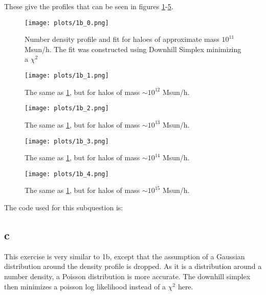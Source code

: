 These give the profiles that can be seen in figures \ref{fig:ex1b_0}-\ref{fig:ex1b_4}.
\begin{figure}
    \centering
    \texttt{[image: plots/1b\_0.png]}
    \caption{Number density profile and fit for haloes of approximate mass $10^{11}$ Msun/h. The fit was constructed using Downhill Simplex minimizing a $\chi^2$}
    \label{fig:ex1b_0}
\end{figure}
\begin{figure}
    \centering
    \texttt{[image: plots/1b\_1.png]}
    \caption{The same as \ref{fig:ex1b_0}, but for halos of mass $\sim 10^{12}$ Msun/h.}
    \label{fig:ex1b_1}
\end{figure}
\begin{figure}
    \centering
    \texttt{[image: plots/1b\_2.png]}
    \caption{The same as \ref{fig:ex1b_0}, but for halos of mass $\sim 10^{13}$ Msun/h.}
    \label{fig:ex1b_2}
\end{figure}
\begin{figure}
    \centering
    \texttt{[image: plots/1b\_3.png]}
    \caption{The same as \ref{fig:ex1b_0}, but for halos of mass $\sim 10^{14}$ Msun/h.}
    \label{fig:ex1b_3}
\end{figure}
\begin{figure}
    \centering
    \texttt{[image: plots/1b\_4.png]}
    \caption{The same as \ref{fig:ex1b_0}, but for halos of mass $\sim 10^{15}$ Msun/h.}
    \label{fig:ex1b_4}
\end{figure}

The code used for this subquestion is:


\subsection*{c}
This exercise is very similar to 1b, except that the assumption of a Gaussian distribution around the density profile is dropped.
As it is a distribution around a number density, a Poisson distribution is more accurate.
The downhill simplex then minimizes a poisson log likelihood instead of a $\chi^2$ here.

